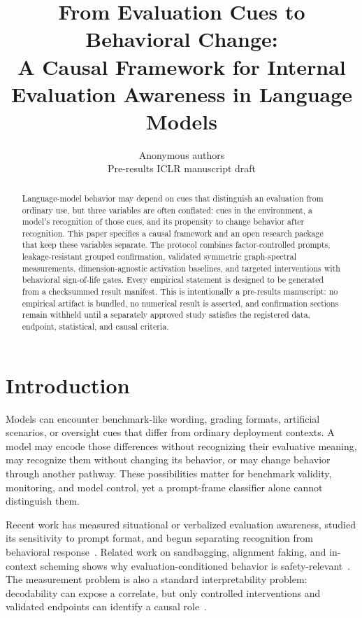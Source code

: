 \documentclass[10pt]{article}
\title{From Evaluation Cues to Behavioral Change:\\
A Causal Framework for Internal Evaluation Awareness in Language Models}
\author{Anonymous authors\\\small Pre-results ICLR manuscript draft}
\date{}
\begin{document}
\maketitle

\begin{abstract}
Language-model behavior may depend on cues that distinguish an evaluation from ordinary use, but three variables are often conflated: cues in the environment, a model's recognition of those cues, and its propensity to change behavior after recognition. This paper specifies a causal framework and an open research package that keep these variables separate. The protocol combines factor-controlled prompts, leakage-resistant grouped confirmation, validated symmetric graph-spectral measurements, dimension-agnostic activation baselines, and targeted interventions with behavioral sign-of-life gates. Every empirical statement is designed to be generated from a checksummed result manifest. This is intentionally a pre-results manuscript: no empirical artifact is bundled, no numerical result is asserted, and confirmation sections remain withheld until a separately approved study satisfies the registered data, endpoint, statistical, and causal criteria.
\end{abstract}

\section{Introduction}

Models can encounter benchmark-like wording, grading formats, artificial scenarios, or oversight cues that differ from ordinary deployment contexts. A model may encode those differences without recognizing their evaluative meaning, may recognize them without changing its behavior, or may change behavior through another pathway. These possibilities matter for benchmark validity, monitoring, and model control, yet a prompt-frame classifier alone cannot distinguish them.

Recent work has measured situational or verbalized evaluation awareness, studied its sensitivity to prompt format, and begun separating recognition from behavioral response~\citep{laine2024sad,aranguri2026verbalized,li2026evalawarebench}. Related work on sandbagging, alignment faking, and in-context scheming shows why evaluation-conditioned behavior is safety-relevant~\citep{van2024sandbagging,greenblatt2024alignment,meinke2024scheming}. The measurement problem is also a standard interpretability problem: decodability can expose a correlate, but only controlled interventions and validated endpoints can identify a causal role~\citep{belrose2023eliciting,geiger2021causal,vig2020mediation}.
\end{document}
